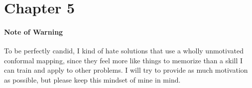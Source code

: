 \section{Chapter 5}

\paragraph{Note of Warning}
To be perfectly candid, I kind of hate solutions that use a wholly unmotivated conformal mapping,
since they feel more like things to memorize than a skill I can train and apply to other problems.
I will try to provide as much motivation as possible, but please keep this mindset of mine in mind.

\begin{enumerate}[wide, labelindent=0pt, label=\arabic*.]

    
    
    
    
    
    
    
    
    
    

\end{enumerate}
